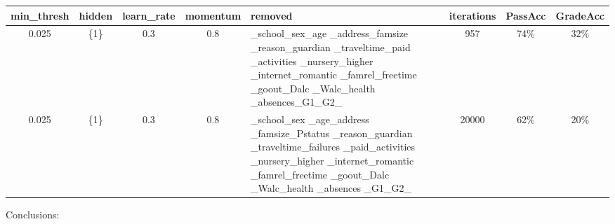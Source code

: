 \documentclass[11pt]{article}
\begin{document}
\newpage
\begin{tabular}{| c | c | c | c | p{3cm} | c | c | c |}
\hline \textbf{min\_thresh} & \textbf{hidden} & \textbf{learn\_rate} & \textbf{momentum} & \textbf{removed} & \textbf{iterations} & \textbf{PassAcc} & \textbf{GradeAcc}\\
\hline 0.025 & \{1\} & 0.3 & 0.8 & \_school\_sex\_age \_address\_famsize \_reason\_guardian \_traveltime\_paid \_activities \_nursery\_higher \_internet\_romantic \_famrel\_freetime \_goout\_Dalc \_Walc\_health \_absences\_G1\_G2\_ & 957 & 74\% & 32\%\\
\hline 0.025 & \{1\} & 0.3 & 0.8 & \_school\_sex \_age\_address \_famsize\_Pstatus \_reason\_guardian \_traveltime\_failures \_paid\_activities \_nursery\_higher \_internet\_romantic \_famrel\_freetime \_goout\_Dalc \_Walc\_health \_absences \_G1\_G2\_ & 20000 & 62\% & 20\%\\
\hline
\end{tabular}
\hfill \break
\hfill \break
Conclusions:
\end{document}
